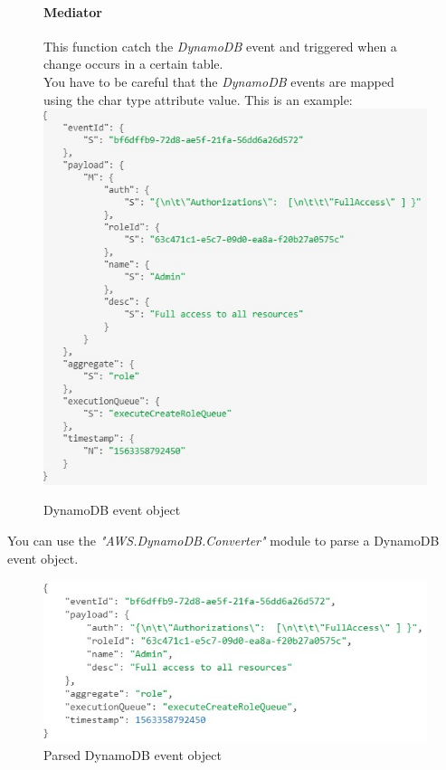 \begin{figure} [H]
\paragraph{Mediator} \Spazio
This function catch the \emph{DynamoDB} event and triggered when a change occurs in a certain table. \\
You have to be careful that the \emph{DynamoDB} events are mapped using the char type attribute value. This is an example: \\

	\centering
	\includegraphics[scale=1.2]{../Img/dynamoEvent}
	\caption{DynamoDB event object}\label{}
\end{figure}

You can use the \emph{"AWS.DynamoDB.Converter"} module to parse a DynamoDB event object.

\begin{figure} [H]
	\centering
	\includegraphics[scale=1.2]{../Img/parsedDynamoEvent}
	\caption{Parsed DynamoDB event object}\label{}
\end{figure}


